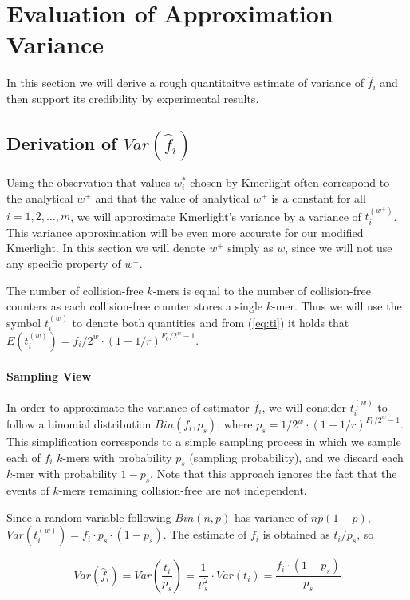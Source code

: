 \section{Evaluation of Approximation Variance}
\label{sec:estimation-variance}

In this section we will derive a rough quantitaitve estimate of variance of $ \hat f_i$
and then support its credibility by experimental results.

\subsection{Derivation of $Var(\hat f_i)$}
Using the observation that values $w_i^*$ chosen by Kmerlight often correspond
to the analytical $w^+$ and that the value of analytical $w^+$ is a constant
for all $i=1, 2, \dots, m$, we will approximate Kmerlight's variance by a variance
of $t_i^{(w^+)}$. This variance approximation will be even more accurate for our modified
Kmerlight. In this section we will denote
$w^+$ simply as $w$, since we will not use any specific property of $w^+$.

The number of collision-free $k$-mers is equal to the number of collision-free counters
as each collision-free counter stores a single $k$-mer. Thus we will use the symbol
$t_i^{(w)}$ to denote both quantities and  from (\ref{eq:ti}) it holds that 
$E(t_i^{(w)}) = f_i/2^w \cdot (1 - 1/r)^{F_0/2^w-1}$.

\paragraph{Sampling View}
In order to approximate the variance of estimator $\hat f_i$, we will consider
$t_i^{(w)}$ to follow a binomial distribution $Bin(f_i, p_s)$, where
$p_s = 1/2^w \cdot (1 - 1/r)^{F_0/2^w-1}$.
This simplification corresponds to a simple sampling process in which we sample each of $f_i$ 
$k$-mers with probability $p_s$ (sampling probability), and we discard each $k$-mer
with probability $1 - p_s$. Note that this approach ignores the fact that the events
of $k$-mers remaining collision-free are not independent. 

Since a random variable following $Bin(n, p)$ has variance of $np(1-p)$, 
$Var(t_i^{(w)}) = f_i \cdot p_s \cdot (1-p_s)$. The estimate of $f_i$ is obtained
as $t_i / p_s$, so

\begin{equation} \label{eq:varhatfi}
Var(\hat f_i) = Var \left( \frac{t_i}{p_s} \right) = \frac{1}{p_s^2}
\cdot Var(t_i) = \frac{f_i \cdot (1 - p_s)}{p_s}
\end{equation}

